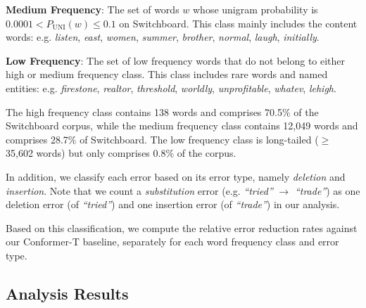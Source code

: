\documentclass[a4paper]{article}
\begin{document}
\noindent
\textbf{Medium Frequency}: The set of words $w$ whose unigram probability is $0.0001 < P_{\mathrm{UNI}}(w) \leq 0.1$ on Switchboard. This class mainly includes the content words: e.g. \textit{listen}, \textit{east}, \textit{women}, \textit{summer}, \textit{brother}, \textit{normal}, \textit{laugh}, \textit{initially}.

\noindent
\textbf{Low Frequency}: The set of low frequency words that do not belong to either high or medium frequency class. This class includes rare words and named entities: e.g.  \textit{firestone}, \textit{realtor}, \textit{threshold}, \textit{worldly}, \textit{unprofitable}, \textit{whatev}, \textit{lehigh}.

The high frequency class contains 138 words and comprises 70.5\% of the Switchboard corpus, while the medium frequency class contains 12,049 words and comprises 28.7\% of Switchboard. The low frequency class is long-tailed ($\geq$ 35,602 words) but only comprises 0.8\% of the corpus.

In addition, we classify each error based on its error type, namely \textit{deletion} and \textit{insertion}. Note that we count a \textit{substitution} error (e.g. \textit{``tried''} $\rightarrow$ \textit{``trade''}) as one deletion error (of \textit{``tried''}) and one insertion error (of \textit{``trade''}) in our analysis.

Based on this classification, we compute the relative error reduction rates against our Conformer-T baseline, separately for each word frequency class and error type.

\subsection{Analysis Results}
\label{subsec:analysis_results}
\end{document}
